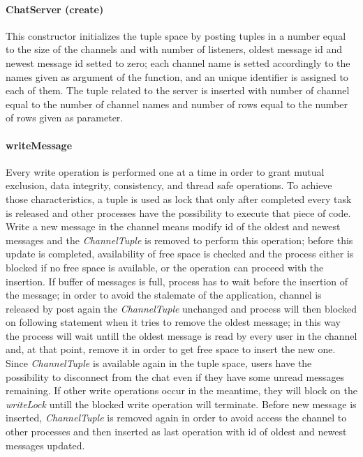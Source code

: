 \documentclass[10pt,a4paper]{article}
\begin{document}
\paragraph{ChatServer (create)} This constructor initializes the tuple space by posting tuples in a number equal to the size of the channels and with number of listeners, oldest message id and newest message id setted to zero; each channel name is setted accordingly to the names given as argument of the function, and an unique identifier is assigned to each of them.
The tuple related to the server is inserted with number of channel equal to the number of channel names and number of rows equal to the number of rows given as parameter.


\paragraph{writeMessage} Every write operation is performed one at a time in order to grant mutual exclusion, data integrity, consistency, and thread safe operations. To achieve those characteristics, a tuple is used as lock that only after completed every task is released  and other processes have the possibility to execute that piece of code.
Write a new message in the channel means modify id of the oldest and newest messages and the \textit{ChannelTuple} is removed to perform this operation; before this update is completed, availability of free space is checked and the process either is blocked if no free space is available, or the operation can proceed with the insertion.
If buffer of messages is full, process has to wait before the insertion of the message; in order to avoid the stalemate of the application, channel is released by post again the \textit{ChannelTuple} unchanged and process will then blocked on following statement when it tries to remove the oldest message; in this way the process will wait untill the oldest message is read by every user in the channel and, at that point, remove it in order to get free space to insert the new one.
Since \textit{ChannelTuple} is available again in the tuple space, users have the possibility to disconnect from the chat even if they have some unread messages remaining.
If other write operations occur in the meantime, they will block on the \textit{writeLock} untill the blocked write operation will terminate.
Before new message is inserted, \textit{ChannelTuple} is removed again in order to avoid access the channel to other processes and then inserted as last operation with id of oldest and newest messages updated.
\end{document}
